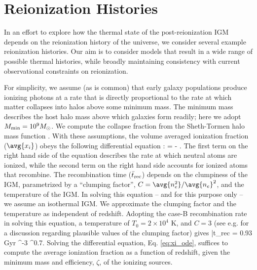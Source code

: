 \section{Reionization Histories}
\label{sec:IGMTempreion_hist}


In an effort to explore how the thermal state of the post-reionization 
IGM depends on the reionization history of the universe, we consider several example reionization histories. 
Our aim is to consider models that result in a wide range of possible thermal histories, while broadly maintaining 
consistency with current observational constraints on reionization. 

For simplicity, we assume (as is common) that early galaxy populations produce ionizing photons at a rate
that is directly proportional
to the rate at which matter collapses into halos above some minimum mass. The minimum mass describes the 
host halo mass above which galaxies form readily; here we adopt $M_{\rm min} = 10^9 M_\odot$. We compute the collapse fraction
from the Sheth-Tormen halo mass function \citep{Sheth:1999su}.
With these assumptions, the volume averaged ionization fraction ($\avg{x_i}$) obeys the following differential equation \citep{1987ApJ...321L.107S,1999ApJ...514..648M}:
\beqa
{} = \zeta {} - .
\label{eq:xi_ode}
\eeqa
The first term on the right hand side of the equation describes the rate at which neutral atoms are ionized, while the second
term on the right hand side accounts for ionized atoms that recombine. The recombination time ($\bar{t}_{\rm rec}$) depends on the clumpiness of the IGM,
parametrized by a ``clumping factor'', $C=\avg{n_e^2}/\avg{n_e}^2$, and the temperature of the IGM. In solving this equation -- and for this purpose only -- we assume an isothermal
IGM. We approximate the clumping factor and the temperature as independent of redshift.
Adopting the case-B recombination rate in solving this equation, a temperature of $T_0 = 2 \times 10^4$ K, and $C=3$ (see e.g. \citealt{Pawlik:2008mr,McQuinn:2011aa} for a discussion regarding plausible values of the clumping factor) gives
\beqa
\bar{t}_{\rm rec} = 0.93 {\rm Gyr}  ^{-3} ^{0.7}.
\label{eq:trec}
\eeqa
Solving the differential equation, Eq. \ref{eq:xi_ode}, suffices to compute the average ionization fraction as a function of redshift, given
the minimum mass and efficiency, $\zeta$, of the ionizing sources.

